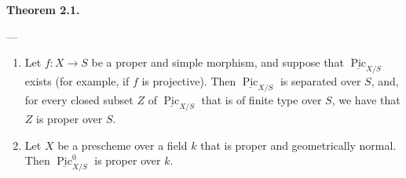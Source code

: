 \documentclass{article}
\providecommand{\tightlist}{%
  \setlength{\itemsep}{0pt}\setlength{\parskip}{0pt}}
\newenvironment{itenv}[1]
  {\phantomsection\par\smallskip\noindent\textbf{#1.}\itshape}
  {\par\smallskip}
\theoremstyle{definition}
\theoremstyle{definition}
\theoremstyle{definition}
\theoremstyle{definition}
\theoremstyle{remark}
\begin{document}
\hypertarget{fga-3-vi-theorem-2.1}{}
\begin{itenv}{Theorem 2.1}

---

\begin{enumerate}
\def\labelenumi{\roman{enumi}.}
\tightlist
\item
  Let \(f\colon X\to S\) be a proper and simple morphism, and suppose that \(\underline{\operatorname{Pic}}_{X/S}\) exists (for example, if \(f\) is projective).
  Then \(\underline{\operatorname{Pic}}_{X/S}\) is separated over \(S\), and, for every closed subset \(Z\) of \(\underline{\operatorname{Pic}}_{X/S}\) that is of finite type over \(S\), we have that \(Z\) is proper over \(S\).
\item
  Let \(X\) be a prescheme over a field \(k\) that is proper and geometrically normal.
  Then \(\underline{\operatorname{Pic}}_{X/S}^0\) is proper over \(k\).
\end{enumerate}

\end{itenv}
\end{document}
